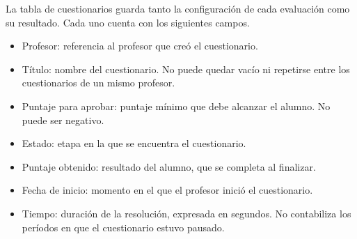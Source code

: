 


La tabla de cuestionarios guarda tanto la configuración de cada evaluación como su resultado. Cada uno cuenta con los siguientes campos.


\begin{itemize}

\item Profesor: referencia al profesor que creó el cuestionario.

\item Título: nombre del cuestionario. No puede quedar vacío ni repetirse entre los cuestionarios de un mismo profesor.

\item Puntaje para aprobar: puntaje mínimo que debe alcanzar el alumno. No puede ser negativo.

\item Estado: etapa en la que se encuentra el cuestionario.

\item Puntaje obtenido: resultado del alumno, que se completa al finalizar.

\item Fecha de inicio: momento en el que el profesor inició el cuestionario.

\item Tiempo: duración de la resolución, expresada en segundos. No contabiliza los períodos en que el cuestionario estuvo pausado.

\end{itemize}

